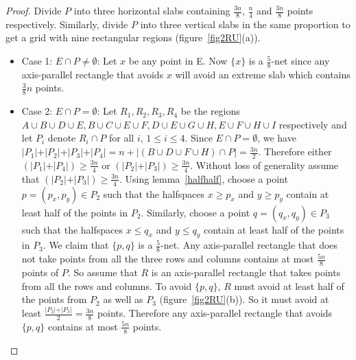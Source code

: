 \begin{proof}
 Divide $P$ into three horizontal slabs containing $\frac{3n}{8}$, $\frac{n}{4}$
and $\frac{3n}{8}$ points respectively. Similarly, divide $P$ into three
vertical slabs in the same proportion to get a grid with nine rectangular
regions (figure~\ref{fig2RU}(a)).
\begin{itemize}
 \item Case 1: $E \cap P \ne \emptyset$: Let $x$ be any point in E. Now $\{x\}$
is a $\frac{5}{8}$-net since any axis-parallel rectangle that avoids ${x}$ will
avoid an extreme slab which contains $\frac{3}{8}n$ points.
\item Case 2: $E \cap P = \emptyset$: Let $R_1, R_2, R_3, R_4$ be the regions $A \cup B \cup D \cup E,B\cup C \cup E\cup F, D\cup E\cup G\cup H, E\cup F\cup H\cup I$ respectively and let $P_i$ denote $R_i \cap P$ for all $i$, $1\leq i \leq 4$. Since $  E \cap P = \emptyset$, we have
$\vert P_1 \vert + \vert P_2 \vert +\vert P_3 \vert + \vert P_4 \vert = n + | (B \cup D \cup F \cup H) \cap P | =
\frac{3n}{2}$. Therefore either $(\vert P_1 \vert + \vert P_4 \vert) \geq \frac{3n}{4}$ or
$(\vert P_2 \vert + \vert P_3 \vert) \geq \frac{3n}{4}$. Without loss of generality
assume that
$(\vert P_2 \vert + \vert P_3 \vert) \geq \frac{3n}{4}$. Using lemma~\ref{halfhalf}, choose a point $p=(p_x,p_y) \in P_2$ such that the halfspaces $x \ge p_x$ and $y \ge p_y$ contain at least half of the points in $P_2$. Similarly, choose a point $q=(q_x,q_y) \in P_3$ such that the halfspaces
$x \leq q_x$ and $y \leq q_y$ contain at least half of the points in $P_3$. We claim that $\{p,q\}$ is a $\frac{5}{8}$-net. Any axis-parallel rectangle that does not take points from all the three rows and columns contains at most $\frac{5n}{8} $ points of $P$. So assume that $R$ is an axis-parallel rectangle that takes points from all the rows and columns. To avoid $\{p,q\}$, $R$ must avoid at least half of
the points from
$P_2$ as well as $P_3$
(figure~\ref{fig2RU}(b)). So it must avoid at least
$\frac{\vert P_2 \vert + \vert P_3 \vert}{2}=\frac{3n}{8}$ points. Therefore any axis-parallel rectangle
that avoids $\{p,q\}$ contains
at most $\frac{5n}{8}$ points.
\end{itemize}


\end{proof}

